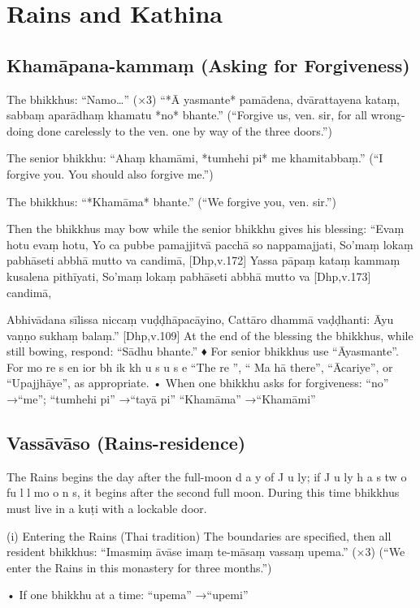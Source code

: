 \chapter{Rains and Kathina}

\section{Khamāpana-kammaṃ (Asking for Forgiveness)}

The bhikkhus: “Namo…” (×3)
“*Ā yasmante* pamādena,
dvārattayena kataṃ,
sabbaṃ aparādhaṃ khamatu *no* bhante.”
(“Forgive us, ven. sir, for all wrong-doing done
carelessly to the ven. one by way of the three doors.”)

The senior bhikkhu:
“Ahaṃ khamāmi,
*tumhehi pi* me khamitabbaṃ.”
(“I forgive you. You should also forgive me.”)

The bhikkhus: “*Khamāma* bhante.”
(“We forgive you, ven. sir.”)

Then the bhikkhus may bow while the senior
bhikkhu gives his blessing:
“Evaṃ hotu evaṃ hotu,
Yo ca pubbe pamajjitvā pacchā so nappamajjati,
So’maṃ lokaṃ pabhāseti abbhā mutto va
candimā,
[Dhp,v.172]
Yassa pāpaṃ kataṃ kammaṃ kusalena pithīyati,
So’maṃ lokaṃ pabhāseti abbhā mutto va
[Dhp,v.173]
candimā,

Abhivādana sīlissa niccaṃ vuḍḍhāpacāyino,
Cattāro dhammā vaḍḍhanti:
Āyu vaṇṇo sukhaṃ balaṃ.” [Dhp,v.109]
At the end of the blessing the bhikkhus, while
still bowing, respond: “Sādhu bhante.”
♦ For senior bhikkhus use “Āyasmante”. For
mo re s en ior bh ik kh u s u s e “The re ”, “ Ma hā there”, “Ācariye”, or “Upajjhāye”, as appropriate.
• When one bhikkhu asks for forgiveness:
“no” →“me”; “tumhehi pi” →“tayā pi”
“Khamāma” →“Khamāmi”

\section{Vassāvāso (Rains-residence)}

The Rains begins the day after the full-moon
d a y of J u ly; if J u ly h a s tw o fu l l mo o n s, it
begins after the second full moon. During this
time bhikkhus must live in a kuṭi with a lockable door.

(i) Entering the Rains (Thai tradition)
The boundaries are specified, then all resident
bhikkhus:
“Imasmiṃ āvāse
imaṃ te-māsaṃ vassaṃ upema.” (×3)
(“We enter the Rains in this monastery
for three months.”)

• If one bhikkhu at a time: “upema” →“upemi”


